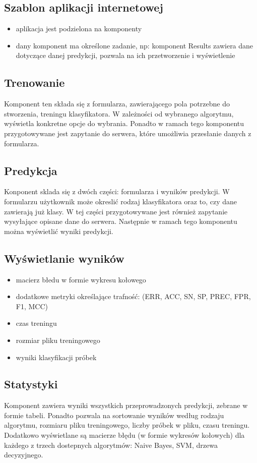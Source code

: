 \documentclass[a4paper, 11pt]{report}
\begin{document}
		\subsection{Szablon aplikacji internetowej}
		\begin{itemize}
		\item aplikacja jest podzielona na komponenty
		\item dany komponent ma określone zadanie, np: komponent Results zawiera dane dotyczące danej predykcji, pozwala na ich przetworzenie i wyświetlenie
		\end{itemize}
		
		\subsection{Trenowanie}
		Komponent ten składa się z formularza, zawierającego pola potrzebne do stworzenia, treningu klasyfikatora. W zależności od wybranego algorytmu, wyświetla konkretne opcje do wybrania. Ponadto w ramach tego komponentu przygotowywane jest zapytanie do serwera, które umożliwia przesłanie danych z formularza. 
		
		\subsection{Predykcja}
		Konponent sklada się z dwóch części: formularza i wyników predykcji. W formularzu użytkownik może okreslić rodzaj klasyfikatora oraz to, czy dane zawierają już klasy. W tej części przygotowywane jest również zapytanie wysyłające opisane dane do serwera. Następnie w ramach tego komponentu można wyświetlić wyniki predykcji. 
		
		\subsection{Wyświetlanie wyników}
		\begin{itemize}
		\item macierz błedu w formie wykresu kołowego
		\item dodatkowe metryki określające trafność: (ERR, ACC, SN, SP, PREC, FPR, F1, MCC)
		\item czas treningu
		\item rozmiar pliku treningowego
		\item wyniki klasyfikacji próbek
		\end{itemize}
		
		\subsection{Statystyki}
		Komponent zawiera wyniki wszystkich przeprowadzonych predykcji, zebrane w formie tabeli. Ponadto pozwala na sortowanie wyników według rodzaju algorytmu, rozmiaru pliku treningowego, liczby próbek w pliku, czasu treningu.
		Dodatkowo wyświetlane są macierze błędu (w formie wykresów kołowych) dla każdego z trzech dostepnych algorytmów: Naive Bayes, SVM, drzewa decyzyjnego.
	
\end{document}
